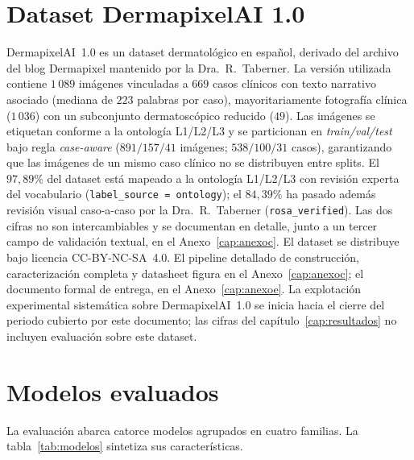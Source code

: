 \section{Dataset DermapixelAI 1.0}
\label{sec:dermapixel}

DermapixelAI~1.0 es un dataset dermatológico en español, derivado
del archivo del blog Dermapixel mantenido por la Dra.~R.~Taberner.
La versión utilizada contiene $1\,089$ imágenes vinculadas a
$669$ casos clínicos con texto narrativo asociado (mediana de
$223$ palabras por caso), mayoritariamente fotografía clínica
($1\,036$) con un subconjunto dermatoscópico reducido
($49$). Las imágenes se etiquetan conforme a la ontología
L1/L2/L3 y se particionan en \emph{train/val/test} bajo regla
\emph{case-aware} ($891 / 157 / 41$ imágenes; $538 / 100 / 31$
casos), garantizando que las imágenes de un mismo caso clínico
no se distribuyen entre splits.
El $97{,}89\%$ del dataset está mapeado a la ontología L1/L2/L3
con revisión experta del vocabulario
(\texttt{label\_source = ontology}); el $84{,}39\%$ ha pasado
además revisión visual caso-a-caso por la Dra.~R.~Taberner
(\texttt{rosa\_verified}). Las dos cifras no son intercambiables y
se documentan en detalle, junto a un tercer campo de validación
textual, en el Anexo~\ref{cap:anexoc}. El dataset se distribuye
bajo licencia CC-BY-NC-SA~4.0. El pipeline detallado de
construcción, caracterización completa y datasheet figura en el
Anexo~\ref{cap:anexoc}; el documento formal de entrega, en el
Anexo~\ref{cap:anexoe}. La explotación experimental sistemática
sobre DermapixelAI~1.0 se inicia hacia el cierre del periodo
cubierto por este documento; las cifras del
capítulo~\ref{cap:resultados} no incluyen evaluación sobre este
dataset.

\section{Modelos evaluados}
\label{sec:modelos}

La evaluación abarca catorce modelos agrupados en cuatro familias.
La tabla~\ref{tab:modelos} sintetiza sus características.


